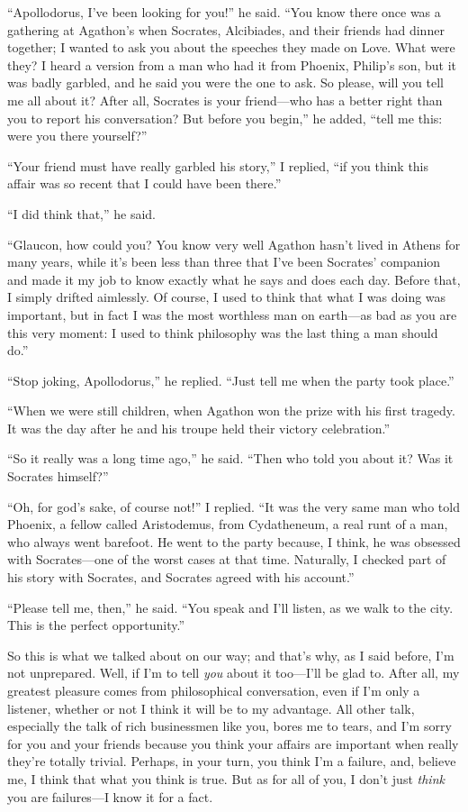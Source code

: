 “Apollodorus, I've been looking for you!” he said. “You know
there once was a gathering at Agathon's when Socrates, Alcibiades, and
their friends had dinner together; I wanted to ask you about the
speeches they made on Love. What were they? I heard a version from a man
who had it from Phoenix, Philip's son, but it was badly garbled, and he
said you were the one to ask. So please, will you tell me all about it?
After all, Socrates is your friend---who has a better right than you to
report his conversation? But before you begin,” he added, “tell me this:
were you there yourself?”

“Your friend must have really garbled his story,” I replied, “if
you think this affair was so recent that I could have been there.”

“I did think that,” he said.

“Glaucon, how could you? You know very well Agathon hasn't lived in
Athens for many years, while it's been less than three that I've been
Socrates' companion and made it my job to know exactly what he says
and does each day. Before that, I simply drifted
aimlessly. Of course, I used to think that what I was doing was
important, but in fact I was the most worthless man on earth---as bad as
you are this very moment: I used to think philosophy was the last thing
a man should do.”

“Stop joking, Apollodorus,” he replied. “Just tell me when the party
took place.”

“When we were still children, when Agathon won the prize with his first
tragedy. It was the day after he and his troupe held their victory
celebration.”

“So it really was a long time ago,” he said. “Then who told you about
it? Was it Socrates himself?”

“Oh, for god's sake, of course not!” I replied. “It was the very same
man who told Phoenix, a fellow called Aristodemus, from
Cydatheneum, a real runt of a man, who always went barefoot. He went to
the party because, I think, he was obsessed with Socrates---one of the
worst cases at that time. Naturally, I checked part of his story with
Socrates, and Socrates agreed with his account.”

“Please tell me, then,” he said. “You speak and I'll listen, as we walk
to the city. This is the perfect opportunity.”

So this is what we talked about on our way; and that's why, as I said
before, I'm not unprepared. Well, if I'm to tell {\em you} about
it too---I'll be glad to. After all, my greatest pleasure comes from
philosophical conversation, even if I'm only a listener, whether or not
I think it will be to my advantage. All other talk, especially the talk
of rich businessmen like you, bores me to tears, and I'm sorry for you
and your friends because you think your affairs are important when
really they're totally trivial. Perhaps, in your turn, you think
I'm a failure, and, believe me, I think that what you think is true. But
as for all of you, I don't just {\em think} you are failures---I know it
for a fact.

